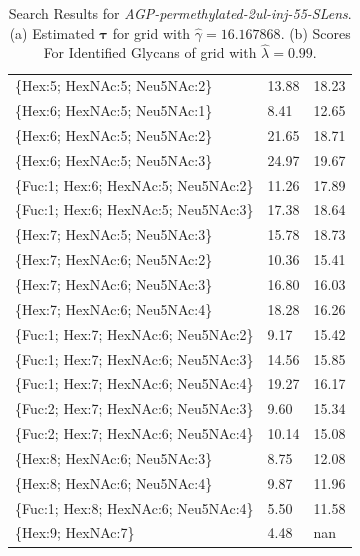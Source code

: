 \begin{table}
\begin{minipage}[t]{0.55\linewidth}
\begin{footnotesize}
\begin{tabular}{l|p{2cm} p{2cm}}
\{Hex:5; HexNAc:5; Neu5NAc:2\}        &                13.88 &              18.23 \\
\{Hex:6; HexNAc:5; Neu5NAc:1\}        &                 8.41 &              12.65 \\
\{Hex:6; HexNAc:5; Neu5NAc:2\}        &                21.65 &              18.71 \\
\{Hex:6; HexNAc:5; Neu5NAc:3\}        &                24.97 &              19.67 \\
\{Fuc:1; Hex:6; HexNAc:5; Neu5NAc:2\} &                11.26 &              17.89 \\
\{Fuc:1; Hex:6; HexNAc:5; Neu5NAc:3\} &                17.38 &              18.64 \\
\{Hex:7; HexNAc:5; Neu5NAc:3\}        &                15.78 &              18.73 \\
\{Hex:7; HexNAc:6; Neu5NAc:2\}        &                10.36 &              15.41 \\
\{Hex:7; HexNAc:6; Neu5NAc:3\}        &                16.80 &              16.03 \\
\{Hex:7; HexNAc:6; Neu5NAc:4\}        &                18.28 &              16.26 \\
\{Fuc:1; Hex:7; HexNAc:6; Neu5NAc:2\} &                 9.17 &              15.42 \\
\{Fuc:1; Hex:7; HexNAc:6; Neu5NAc:3\} &                14.56 &              15.85 \\
\{Fuc:1; Hex:7; HexNAc:6; Neu5NAc:4\} &                19.27 &              16.17 \\
\{Fuc:2; Hex:7; HexNAc:6; Neu5NAc:3\} &                 9.60 &              15.34 \\
\{Fuc:2; Hex:7; HexNAc:6; Neu5NAc:4\} &                10.14 &              15.08 \\
\{Hex:8; HexNAc:6; Neu5NAc:3\}        &                 8.75 &              12.08 \\
\{Hex:8; HexNAc:6; Neu5NAc:4\}        &                 9.87 &              11.96 \\
\{Fuc:1; Hex:8; HexNAc:6; Neu5NAc:4\} &                 5.50 &              11.58 \\
\{Hex:9; HexNAc:7\}                   &                 4.48 &                nan \\
\end{tabular}

    \end{footnotesize}
    
        \end{minipage}
        \caption{
                 Search Results for \textit{AGP-permethylated-2ul-inj-55-SLens}.
                 (a) Estimated $\mathbf{\tau}$ for grid with ${\hat \gamma} = 16.167868$.
                 (b) Scores For Identified Glycans of grid with ${\hat \lambda} = 0.99$.}
        \label{tbl:rp_agp_score_table}
    \end{table}
